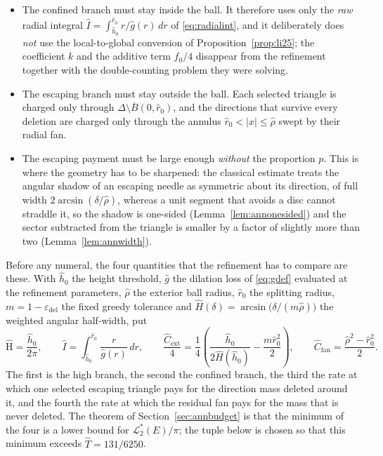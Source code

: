 \documentclass[11pt]{article}
\theoremstyle{plain}
\theoremstyle{definition}
\theoremstyle{remark}
\newcommand{\Lout}{\mathcal{L}^{*}_{2}}
\newcommand{\epsdel}{\varepsilon_{\mathrm{del}}}
\begin{document}
\begin{itemize}
  \item The confined branch must stay inside the ball. It therefore uses only
    the \emph{raw} radial integral $\hat I=\int_{\hat h_{0}}^{\hat r_{0}}r/\hat
    g(r)\,dr$ of \eqref{eq:radialint}, and it deliberately does \emph{not} use
    the local-to-global conversion of Proposition~\ref{prop:li25}; the
    coefficient $k$ and the additive term $f_{0}/4$ disappear from the
    refinement together with the double-counting problem they were solving.
  \item The escaping branch must stay outside the ball. Each selected triangle
    is charged only through $\Delta\setminus\overline B(0,\hat r_{0})$, and the
    directions that survive every deletion are charged only through the
    annulus $\hat r_{0}<|x|\le\hat\rho$ swept by their radial fan.
  \item The escaping payment must be large enough \emph{without} the
    proportion $p$. This is where the geometry has to be sharpened: the
    classical estimate treats the angular shadow of an escaping needle as
    symmetric about its direction, of full width $2\arcsin(\delta/\hat\rho)$,
    whereas a unit segment that avoids a disc cannot straddle it, so the
    shadow is one-sided (Lemma~\ref{lem:annonesided}) and the sector subtracted
    from the triangle is smaller by a factor of slightly more than two
    (Lemma~\ref{lem:annwidth}).
\end{itemize}

Before any numeral, the four quantities that the refinement has to compare are
these. With $\hat h_{0}$ the height threshold, $\hat g$ the dilation loss of
\eqref{eq:gdef} evaluated at the refinement parameters, $\hat\rho$ the exterior
ball radius, $\hat r_{0}$ the splitting radius, $m=1-\epsdel$ the fixed greedy
tolerance and $\hat H(\delta)=\arcsin\bigl(\delta/(m\hat\rho)\bigr)$ the
weighted angular half-width, put
\begin{equation}\label{eq:annsymbolic}
  \hat{\mathrm{H}}=\frac{\hat h_{0}}{2\pi},
  \qquad
  \hat I=\int_{\hat h_{0}}^{\hat r_{0}}\frac{r}{\hat g(r)}\,dr,
  \qquad
  \frac{\hat C_{\mathrm{ext}}}{4}
  =\frac{1}{4}\left(\frac{\hat h_{0}}{2\hat H(\hat h_{0})}
    -\frac{m\hat r_{0}^{2}}{2}\right),
  \qquad
  \hat C_{\mathrm{fan}}=\frac{\hat\rho^{2}-\hat r_{0}^{2}}{2}.
\end{equation}
The first is the high branch, the second the confined branch, the third the
rate at which one selected escaping triangle pays for the direction mass
deleted around it, and the fourth the rate at which the residual fan pays for
the mass that is never deleted. The theorem of Section~\ref{sec:annbudget} is
that the minimum of the four is a lower bound for $\Lout(E)/\pi$; the tuple
below is chosen so that this minimum exceeds $\hat T=131/6250$.
\end{document}
